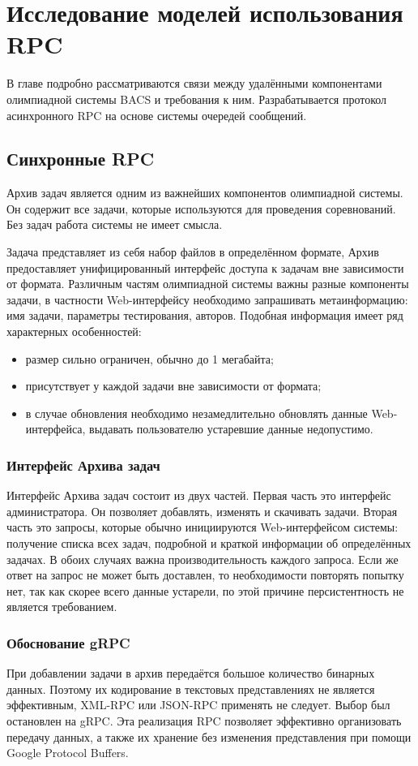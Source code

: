 \chapter{Исследование моделей использования RPC}
В главе подробно рассматриваются связи между удалёнными компонентами
олимпиадной системы BACS и требования к ним. Разрабатывается
протокол асинхронного RPC на основе системы очередей сообщений.

\section{Синхронные RPC}
Архив задач является одним из важнейших компонентов олимпиадной системы.
Он содержит все задачи, которые используются для проведения соревнований.
Без задач работа системы не имеет смысла.

Задача представляет из себя набор файлов в определённом формате,
Архив предоставляет унифицированный интерфейс доступа к задачам
вне зависимости от формата. Различным частям олимпиадной системы важны
разные компоненты задачи, в частности Web-интерфейсу необходимо запрашивать
метаинформацию: имя задачи, параметры тестирования, авторов. Подобная
информация имеет ряд характерных особенностей:
\begin{itemize}
    \item размер сильно ограничен, обычно до 1 мегабайта;
    \item присутствует у каждой задачи вне зависимости от формата;
    \item в случае обновления необходимо незамедлительно обновлять
        данные Web-интерфейса, выдавать пользователю устаревшие данные
        недопустимо.
\end{itemize}

\subsection{Интерфейс Архива задач}
Интерфейс Архива задач состоит из двух частей. Первая часть это интерфейс
администратора. Он позволяет добавлять, изменять и скачивать задачи.
Вторая часть это запросы, которые обычно инициируются Web-интерфейсом
системы: получение списка всех задач, подробной и краткой информации
об определённых задачах. В обоих случаях важна производительность каждого
запроса. Если же ответ на запрос не может быть доставлен, то необходимости
повторять попытку нет, так как скорее всего данные устарели, по этой причине
персистентность не является требованием.

\subsection{Обоснование gRPC}
При добавлении задачи в архив передаётся большое количество бинарных данных.
Поэтому их кодирование в текстовых представлениях не является эффективным,
XML-RPC или JSON-RPC применять не следует. Выбор был остановлен на gRPC.
Эта реализация RPC позволяет эффективно организовать передачу данных,
а также их хранение без изменения представления при помощи Google Protocol
Buffers.

